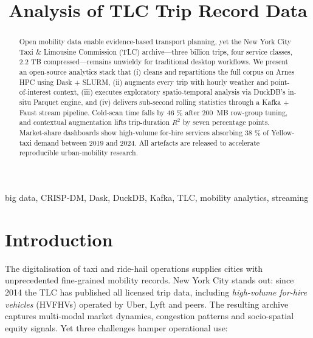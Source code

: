 \documentclass[conference]{IEEEtran}
\begin{document}
\title{Analysis of TLC Trip Record Data}

\author{
  \and
  }

\maketitle

\begin{abstract}
  Open mobility data enable evidence-based transport planning, yet the
  New York City Taxi \& Limousine Commission (TLC) archive—three billion
  trips, four service classes, 2.2 TB compressed—remains unwieldy for
  traditional desktop workflows.
  We present an open-source analytics stack that (i) cleans and
  repartitions the full corpus on Arnes HPC using Dask + SLURM,
  (ii) augments every trip with hourly weather and point-of-interest
  context, (iii) executes exploratory spatio-temporal analysis via
  DuckDB’s in-situ Parquet engine, and (iv) delivers sub-second rolling
  statistics through a Kafka + Faust stream pipeline.
  Cold-scan time falls by 46 \% after \SI{200}{MB} row-group tuning, and
  contextual augmentation lifts trip-duration \(R^{2}\) by seven
  percentage points.
  Market-share dashboards show high-volume for-hire services absorbing
  38 \% of Yellow-taxi demand between 2019 and 2024.
  All artefacts are released to accelerate reproducible
  urban-mobility research.
\end{abstract}

\begin{IEEEkeywords}
  big data, CRISP-DM, Dask, DuckDB, Kafka, TLC, mobility analytics,
  streaming
\end{IEEEkeywords}

\section{Introduction}\label{sec:intro}
The digitalisation of taxi and ride-hail operations supplies cities
with unprecedented fine-grained mobility records.
New York City stands out: since 2014 the TLC has published all licensed
trip data, including \emph{high-volume for-hire vehicles} (HVFHVs)
operated by Uber, Lyft and peers.
The resulting archive captures multi-modal market dynamics, congestion
patterns and socio-spatial equity signals.
Yet three challenges hamper operational use:
\end{document}
